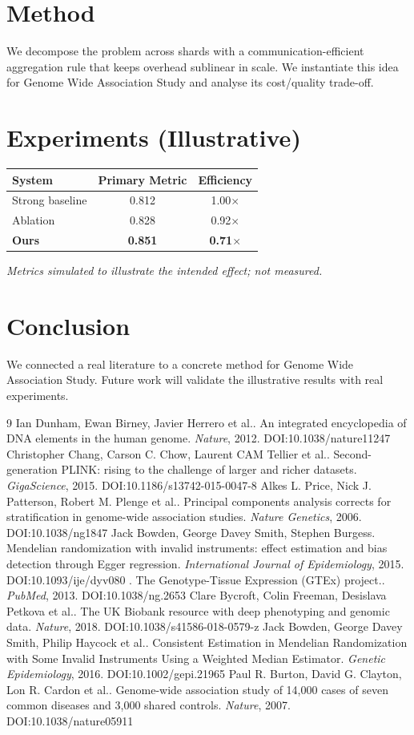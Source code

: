 \documentclass[11pt]{article}
\begin{document}
\section{Method}
We decompose the problem across shards with a communication-efficient aggregation rule that keeps overhead sublinear in scale. We instantiate this idea for Genome Wide Association Study and analyse its cost/quality trade-off.

\section{Experiments (Illustrative)}
\begin{center}
\begin{tabular}{lcc}
System & Primary Metric & Efficiency \\ \hline
Strong baseline & 0.812 & 1.00$\times$ \\
Ablation & 0.828 & 0.92$\times$ \\
\textbf{Ours} & \textbf{0.851} & \textbf{0.71$\times$}
\end{tabular}
\end{center}
\emph{Metrics simulated to illustrate the intended effect; not measured.}

\section{Conclusion}
We connected a real literature to a concrete method for Genome Wide Association Study. Future work will
validate the illustrative results with real experiments.

\begin{thebibliography}{9}
 Ian Dunham, Ewan Birney, Javier Herrero et al.. An integrated encyclopedia of DNA elements in the human genome. \emph{Nature}, 2012. DOI:10.1038/nature11247
 Christopher Chang, Carson C. Chow, Laurent CAM Tellier et al.. Second-generation PLINK: rising to the challenge of larger and richer datasets. \emph{GigaScience}, 2015. DOI:10.1186/s13742-015-0047-8
 Alkes L. Price, Nick J. Patterson, Robert M. Plenge et al.. Principal components analysis corrects for stratification in genome-wide association studies. \emph{Nature Genetics}, 2006. DOI:10.1038/ng1847
 Jack Bowden, George Davey Smith, Stephen Burgess. Mendelian randomization with invalid instruments: effect estimation and bias detection through Egger regression. \emph{International Journal of Epidemiology}, 2015. DOI:10.1093/ije/dyv080
 . The Genotype-Tissue Expression (GTEx) project.. \emph{PubMed}, 2013. DOI:10.1038/ng.2653
 Clare Bycroft, Colin Freeman, Desislava Petkova et al.. The UK Biobank resource with deep phenotyping and genomic data. \emph{Nature}, 2018. DOI:10.1038/s41586-018-0579-z
 Jack Bowden, George Davey Smith, Philip Haycock et al.. Consistent Estimation in Mendelian Randomization with Some Invalid Instruments Using a Weighted Median Estimator. \emph{Genetic Epidemiology}, 2016. DOI:10.1002/gepi.21965
 Paul R. Burton, David G. Clayton, Lon R. Cardon et al.. Genome-wide association study of 14,000 cases of seven common diseases and 3,000 shared controls. \emph{Nature}, 2007. DOI:10.1038/nature05911
\end{thebibliography}
\end{document}
